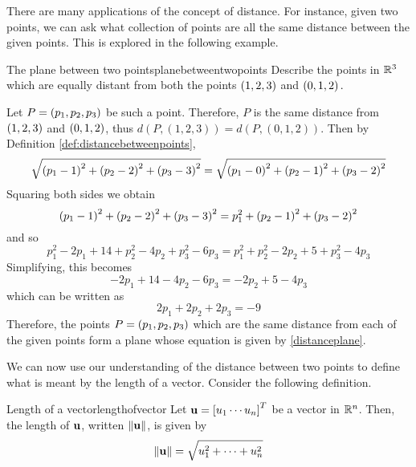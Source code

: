 There are many applications of the concept of distance. For instance,
given two points, we can ask what collection of points are all the
same distance between the given points. This is explored in the
following example.

\begin{example}{The plane between two points}{planebetweentwopoints}
Describe the points in $\mathbb{R}^3$ which are equally distant from both the points $\left(
1,2,3\right) $ and $\left(0,1,2\right) .$
\end{example}

\begin{solution}
Let $P = \left(p_1 , p_2, p_3\right) $ be such a point. Therefore, $P$ is the same distance from $\left(
1,2,3\right) $ and $\left(0,1,2\right) $, thus $d(P,(1,2,3))=d(P,(0,1,2))$.
Then by Definition \ref{def:distancebetweenpoints},
\begin{equation*}
\sqrt{\left(p_1 -1\right) ^{2}+\left(p_2 -2\right) ^{2}+\left(p_3-3\right) ^{2}}=
\sqrt{\left(p_1 - 0 \right)^{2}+\left(p_2-1\right) ^{2}+\left(p_3-2\right) ^{2}}
\end{equation*}
Squaring both sides we obtain 
\begin{equation*}
\left(p_1 -1\right) ^{2}+\left(p_2 -2\right) ^{2}+\left(p_3 -3\right)
^{2}=p_1^{2}+\left(p_2-1\right) ^{2}+\left(p_3 -2\right) ^{2}
\end{equation*}
and so
\begin{equation*}
\allowbreak p_1^{2}-2p_1+14+p_2^{2}-4p_2+p_3^{2}-6p_3=p_1^{2}+p_2^{2}-2p_2+5+p_3^{2}-4p_3
\end{equation*}
Simplifying, this becomes
\begin{equation*}
-2p_1+14-4p_2-6p_3=-2p_2+5-4p_3
\end{equation*}
which can be written as 
\begin{equation}
2p_1+2p_2+2p_3=-9  \label{distanceplane}
\end{equation}
Therefore, the points $P = \left(
p_1,p_2,p_3\right) $  which are the same 
distance from each of the given points form a plane whose equation is given by \ref{distanceplane}.
\end{solution}

We can now use our understanding of the distance between two points to define what is meant by the length of a 
vector. Consider the following definition.  

\begin{definition}{Length of a vector}{lengthofvector}
Let ${\bf u} = \left[u_{1} \cdots u_{n} \right]^T$ be a vector in
$\mathbb{R}^n$. Then, the length of ${\bf u}$, written $\| {\bf u} \|$, is given by
\begin{equation*}
\|
{\bf u}
\|
= \sqrt{ u_{1}^2 + \cdots + u_{n}^2}
\end{equation*}
\end{definition}


